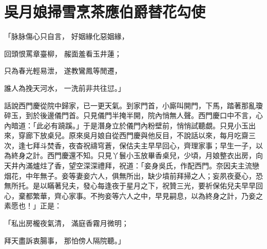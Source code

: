 %

\chapter{吳月娘掃雪烹茶\KG 應伯爵替花勾使}


\begin{showcontents}{}



「脉脉傷心只自言， 好姻緣化惡姻緣，

回頭恨罵章臺柳， 赧面羞看玉井蓮；

只為春光輕易泄， 遂教鸞鳳等閒遷，

誰人為挽天河水， 一洗前非共往愆。」

話說西門慶從院中歸家，已一更天氣。到家門首，小廝叫開門，下馬，踏著那亂瓊碎玉，到於後邊儀門首。只見儀門半掩半開，院內悄無人聲。西門慶口中不言，心內暗道：「此必有蹺蹊。」于是潛身立於儀門內粉壁前，悄悄試聽覷。只見小玉出來，穿廊下放桌兒。原來吳月娘自從西門慶與他反目，不說話以來，每月吃齋三次，逢七拜斗焚香，夜杳祝禱穹蒼，保估夫主早早回心，齊理家事；早生一子，以為終身之計。西門慶還不知。只見丫鬟小玉放畢香桌兒，少頃，月娘整衣出房，向天井內滿爐炷了香，望空深深禮拜，祝道：「妾身吳氏，作配西門。奈因夫主流戀烟花，中年無子。妾等妻妾六人，俱無所出，缺少墳前拜掃之人；妄夙夜憂心，恐無所托。是以瞞著兒夫，發心每逢夜于星月之下，祝贊三光，要祈保佑兒夫早早回心，棄都繁華，齊心家事。不拘妾等六人之中，早見嗣息，以為終身之計，乃妾之素愿也！」正是：

「私出房櫳夜氣清， 滿庭香霧月微明；

拜天盡訴衷腸事， 那怕傍人隔院聽。」


\end{showcontents}

